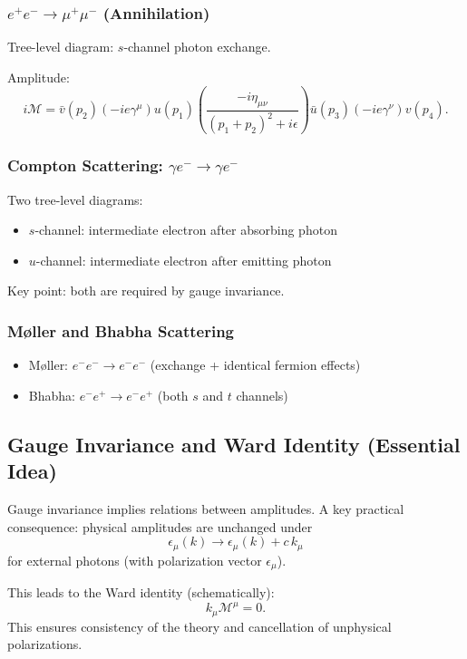 \subsubsection{$e^+e^-\to \mu^+\mu^-$ (Annihilation)}
Tree-level diagram: $s$-channel photon exchange.

Amplitude:
\begin{equation}
i\mathcal{M}
=
\bar{v}(p_2)(-ie\gamma^\mu)u(p_1)
\left(\frac{-i\eta_{\mu\nu}}{(p_1+p_2)^2+i\epsilon}\right)
\bar{u}(p_3)(-ie\gamma^\nu)v(p_4).
\end{equation}

\subsubsection{Compton Scattering: $\gamma e^- \to \gamma e^-$}
Two tree-level diagrams:
\begin{itemize}
\item $s$-channel: intermediate electron after absorbing photon
\item $u$-channel: intermediate electron after emitting photon
\end{itemize}
Key point: both are required by gauge invariance.

\subsubsection{M\o ller and Bhabha Scattering}
\begin{itemize}
\item M\o ller: $e^-e^-\to e^-e^-$ (exchange + identical fermion effects)
\item Bhabha: $e^-e^+\to e^-e^+$ (both $s$ and $t$ channels)
\end{itemize}

\subsection{Gauge Invariance and Ward Identity (Essential Idea)}
Gauge invariance implies relations between amplitudes.
A key practical consequence: physical amplitudes are unchanged under
\begin{equation}
\epsilon_\mu(k)\to \epsilon_\mu(k)+c\,k_\mu
\end{equation}
for external photons (with polarization vector $\epsilon_\mu$).

This leads to the Ward identity (schematically):
\begin{equation}
k_\mu \mathcal{M}^\mu = 0.
\end{equation}
This ensures consistency of the theory and cancellation of unphysical polarizations.

